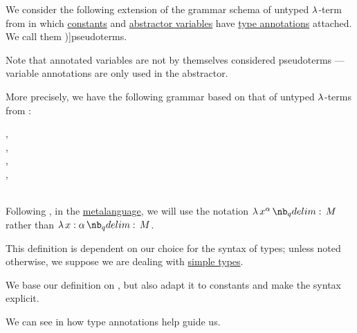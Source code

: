 \begin{definition}\label{def:pseudoterm}\mimprovised
  We consider the following extension of the grammar schema of untyped \( \synlambda \)-term from  in which \hyperref[def:lambda_term/const]{constants} and \hyperref[def:lambda_abstractor]{abstractor variables} have \hyperref[con:type_annotation]{type annotations} attached. We call them \term[en=pseudoterm (\cite[def. 3.2.1]{Barendregt1992Types})]{pseudoterms}.

  Note that annotated variables are not by themselves considered pseudoterms --- variable annotations are only used in the abstractor.

  More precisely, we have the following grammar based on that of untyped \( \synlambda \)-terms from :
  \begin{bnf*}
         { \bnfsp \bnftsq{:} \bnfsp {}}, \\
         { \bnfsp \bnftsq{:} \bnfsp {}}, \\
     {\bnftsq{\( ( \)} \bnfsp {} \bnfsp {} \bnfsp \bnftsq{\( ) \)}}, \\
     {\bnftsq{\( ( \)} \bnfsp \bnftsq{\( \synlambda \)} \bnfsp {} \bnfsp {} \bnfsp {} \bnfsp \bnftsq{\( ) \)}}, \\
                 { \bnfor {} \bnfor} \\
  \end{bnf*}

  Following , in the \hyperref[con:metalanguage]{metalanguage}, we will use the notation \( \qabs {x^\alpha} M \) rather than \( \qabs {x: \alpha} M \).
\end{definition}
\begin{comments}
  \item This definition is dependent on our choice for the syntax of types; unless noted otherwise, we suppose we are dealing with \hyperref[def:simple_type]{simple types}.

  \item We base our definition on , but also adapt it to constants and make the syntax explicit.

  We can see in  how type annotations help guide us.
\end{comments}

